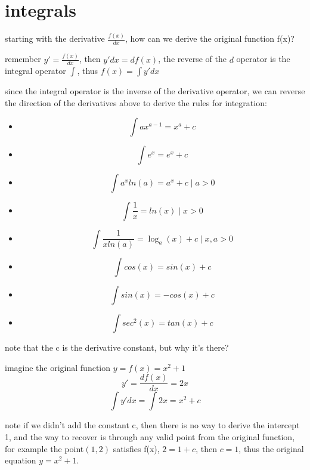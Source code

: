 \documentclass[4apaper,12pt]{book}
\begin{document}
  \section{integrals}
  \begin{description}
  \item starting with the derivative $\frac{f(x)}{dx}$, how can we derive the original function f(x)?
  \item remember $y\prime=\frac{f(x)}{dx}$, then $y\prime{dx=df(x)}$, the reverse of the $d$ operator is the integral operator $\int$, thus $f(x) =\int{y\prime{dx}}$
  \item since the integral operator is the inverse of the derivative operator, we can reverse the direction of the derivatives above to derive the rules for integration:
    \begin{itemize}
    \item \begin{equation} \int ax^{a-1} = x^a + c  \end{equation}
    \item \begin{equation} \int e^x = e^x + c\end{equation}
    \item \begin{equation} \int a^xln(a) = a^x +c \mid a>0 \end{equation}
    \item \begin{equation} \int \frac{1}{x} = ln(x)  \mid x>0 \end{equation}
    \item \begin{equation} \int \frac{1}{xln(a)} = \log_{a}(x) +c   \mid x,a>0 \end{equation}
    \item \begin{equation} \int cos(x) = sin(x) + c\end{equation}
    \item \begin{equation} \int sin(x) = -cos(x) + c   \end{equation}
    \item \begin{equation} \int sec^2(x) =  tan(x) + c   \end{equation}
    \end{itemize}
  \item note that the c is the derivative constant, but why it's there?
  \item imagine the original function $y=f(x) = x^2 + 1$
    \begin{equation}  y\prime=\frac{df(x)}{dx} = 2x \end{equation}
    \begin{equation} \int y\prime dx = \int 2x = x^2 + c \end{equation}
    \item note if we didn't add the constant c, then there is no way to derive the intercept 1, and the way to recover is through any valid point from the original function, for example the point$(1,2)$ satisfies f(x), $2 = 1 + c$, then $c=1$, thus the original equation $y=x^2+1$.
  \end{description}
\end{document}

